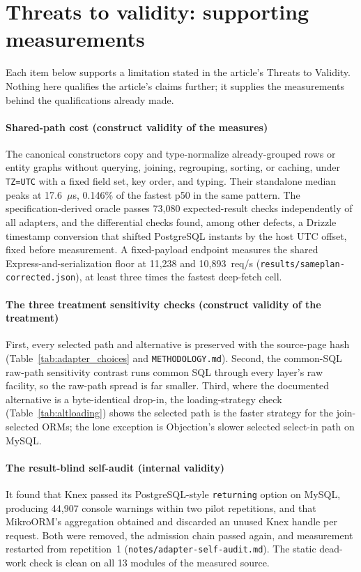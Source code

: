 \documentclass[11pt,a4paper]{article}
\begin{document}
\section{Threats to validity: supporting measurements}
\label{sup:threats-detail}
Each item below supports a limitation stated in the article's Threats to Validity. Nothing here
qualifies the article's claims further; it supplies the measurements behind the qualifications
already made.

\paragraph{Shared-path cost (construct validity of the measures)} The canonical constructors copy and
type-normalize already-grouped rows or entity graphs without querying, joining, regrouping, sorting,
or caching, under \texttt{TZ=UTC} with a fixed field set, key order, and typing. Their standalone
median peaks at 17.6~\(\mu\)s, 0.146\% of the fastest p50 in the same pattern. The
specification-derived oracle passes 73{,}080 expected-result checks independently of all adapters,
and the differential checks found, among other defects, a Drizzle timestamp conversion that shifted
PostgreSQL instants by the host UTC offset, fixed before measurement. A fixed-payload endpoint
measures the shared Express-and-serialization floor at 11{,}238 and 10{,}893~req/s
(\texttt{results/sameplan-corrected.json}), at least three times the fastest deep-fetch cell.

\paragraph{The three treatment sensitivity checks (construct validity of the treatment)} First, every
selected path and alternative is preserved with the source-page hash (Table~\ref{tab:adapter_choices} and \texttt{METHODOLOGY.md}). Second, the common-SQL raw-path sensitivity contrast runs common SQL
through every layer's raw facility, so the raw-path spread is far smaller. Third, where the
documented alternative is a byte-identical drop-in, the loading-strategy check
(Table~\ref{tab:altloading}) shows the selected path is the faster strategy for the join-selected
ORMs; the lone exception is Objection's slower selected select-in path on MySQL.

\paragraph{The result-blind self-audit (internal validity)} It found that Knex passed its
PostgreSQL-style \texttt{returning} option on MySQL, producing 44{,}907 console warnings within two
pilot repetitions, and that MikroORM's aggregation obtained and discarded an unused Knex handle per
request. Both were removed, the admission chain passed again, and measurement restarted from
repetition~1 (\texttt{notes/adapter-self-audit.md}). The static dead-work check is clean on all 13
modules of the measured source.
\end{document}
